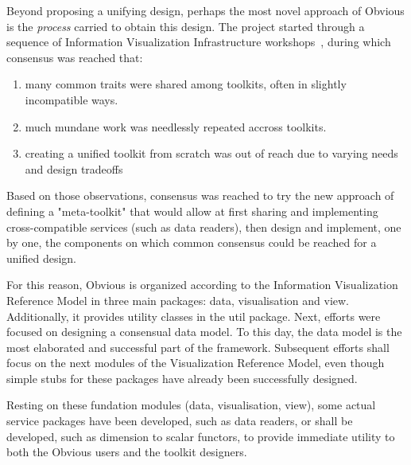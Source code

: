 

Beyond proposing a unifying design, perhaps the most novel approach of Obvious is the \emph{process} carried to obtain this design.
The project started through a sequence of Information Visualization Infrastructure workshops~\cite{visinfrastructure1,visinfrastructure2,vismaster2008},
during which consensus was reached that:
\begin{enumerate}
\item many common traits were shared among toolkits, often in slightly incompatible ways.
\item much mundane work was needlessly repeated accross toolkits.
\item creating a unified toolkit from scratch was out of reach due to varying needs and design tradeoffs
\end{enumerate}
Based on those observations, consensus was reached to try the new approach of defining a "meta-toolkit" that would allow at first sharing and implementing
cross-compatible services (such as data readers), then design and implement, one by one, the components on which common consensus could be reached 
for a unified design.

For this reason, Obvious is organized according to the Information Visualization Reference Model in three main packages: data, visualisation and view. Additionally, it provides utility classes in the util package. Next, efforts were focused on designing a consensual data model. To this day, the data model is the most elaborated and successful part of the framework. Subsequent efforts shall focus on the next modules of the Visualization Reference Model, even though simple stubs for these packages have already been successfully designed.

Resting on these fundation modules (data, visualisation, view), some actual service packages have been developed, such as data readers, or shall be developed, such as dimension to scalar functors, to provide immediate utility to both the Obvious users and the toolkit designers.


